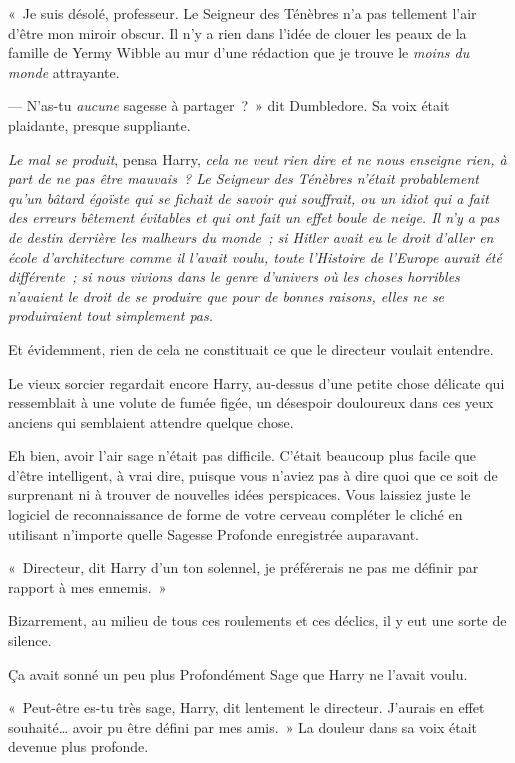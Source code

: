 «~Je suis désolé, professeur. Le Seigneur des Ténèbres n'a pas tellement l'air d'être mon miroir obscur. Il n'y a rien dans l'idée de clouer les peaux de la famille de Yermy Wibble au mur d'une rédaction que je trouve le \emph{moins du monde} attrayante.

--- N'as-tu \emph{aucune} sagesse à partager~?~» dit Dumbledore. Sa voix était plaidante, presque suppliante.

\emph{Le mal se produit}, pensa Harry, \emph{cela ne veut rien dire et ne nous enseigne rien, à part de ne pas être mauvais~? Le Seigneur des Ténèbres n'était probablement qu'un bâtard égoïste qui se fichait de savoir qui souffrait, ou un idiot qui a fait des erreurs bêtement évitables et qui ont fait un effet boule de neige. Il n'y a pas de destin derrière les malheurs du monde~; si Hitler avait eu le droit d'aller en école d'architecture comme il l'avait voulu, toute l'Histoire de l'Europe aurait été différente~; si nous vivions dans le genre d'univers où les choses horribles n'avaient le droit de se produire que pour de bonnes raisons, elles ne se produiraient tout simplement pas.}

Et évidemment, rien de cela ne constituait ce que le directeur voulait entendre.

Le vieux sorcier regardait encore Harry, au-dessus d'une petite chose délicate qui ressemblait à une volute de fumée figée, un désespoir douloureux dans ces yeux anciens qui semblaient attendre quelque chose.

Eh bien, avoir l'air sage n'était pas difficile. C'était beaucoup plus facile que d'être intelligent, à vrai dire, puisque vous n'aviez pas à dire quoi que ce soit de surprenant ni à trouver de nouvelles idées perspicaces. Vous laissiez juste le logiciel de reconnaissance de forme de votre cerveau compléter le cliché en utilisant n'importe quelle Sagesse Profonde enregistrée auparavant.

«~Directeur, dit Harry d'un ton solennel, je préférerais ne pas me définir par rapport à mes ennemis.~»

Bizarrement, au milieu de tous ces roulements et ces déclics, il y eut une sorte de silence.

Ça avait sonné un peu plus Profondément Sage que Harry ne l'avait voulu.

«~Peut-être es-tu très sage, Harry, dit lentement le directeur. J'aurais en effet souhaité… avoir pu être défini par mes amis.~» La douleur dans sa voix était devenue plus profonde.

